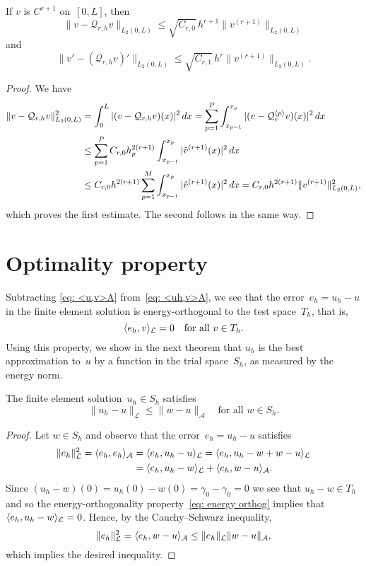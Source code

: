 \begin{theorem}\label{thm: Q r h}
If $v$ is $C^{r+1}$ on~$[0,L]$, then
\[
\|v-\mathcal{Q}_{r,h}v\|_{L_2(0,L)}
    \le\sqrt{C_{r,0}}\,h^{r+1}\|v^{(r+1)}\|_{L_2(0,L)}
\]
and
\[
\|v'-(\mathcal{Q}_{r,h}v)'\|_{L_2(0,L)}
    \le\sqrt{C_{r,1}}\,h^r\|v^{(r+1)}\|_{L_2(0,L)}.
\]
\end{theorem}
\begin{proof}
We have
\begin{align*}
\|v-\mathcal{Q}_{r,h}v\|_{L_2(0,L)}^2
    &=\int_0^L|(v-\mathcal{Q}_{r,h}v)(x)|^2\,dx=\sum_{p=1}^P
    \int_{x_{p-1}}^{x_p}|(v-\mathcal{Q}_r^{\langle p\rangle}v)(x)|^2\,dx\\
    &\le\sum_{p=1}^P C_{r,0}h_p^{2(r+1)}\int_{x_{p-1}}^{x_p}
        |\hat v^{(r+1)}(x)|^2\,dx\\
    &\le C_{r,0}h^{2(r+1)}\sum_{p=1}^M\int_{x_{p-1}}^{x_p} 
        |\hat v^{(r+1)}(x)|^2\,dx
    =C_{r,0}h^{2(r+1)}\|v^{(r+1)}\|_{L_2(0,L)}^2,
\end{align*}
which proves the first estimate.  The second follows in the same way.
\end{proof}

\section{Optimality property}
Subtracting \eqref{eq: <u,v>A} from~\eqref{eq: <uh,v>A}, we see that the
error~$e_h=u_h-u$ in the finite element solution is energy-orthogonal to the 
test space~$T_h$, that is, 
\begin{equation}\label{eq: energy orthog}
\langle e_h,v\rangle_{\mathcal{L}}=0\quad\text{for all $v\in T_h$.}
\end{equation}
Using this property, we show in the next theorem that $u_h$ is the best 
approximation to~$u$ by a function in the trial space~$S_h$, as measured by 
the energy norm.

\begin{theorem}\label{thm: optimality}
The finite element solution~$u_h\in S_h$ satisfies
\[
\|u_h-u\|_{\mathcal{L}}\le\|w-u\|_{\mathcal{A}}
	\quad\text{for all $w\in S_h$.}
\]
\end{theorem}
\begin{proof}
Let $w\in S_h$ and observe that the error~$e_h=u_h-u$ satisfies
\begin{align*}
\|e_h\|_{\mathcal{L}}^2=\langle e_h,e_h\rangle_{\mathcal{A}}
	&=\langle e_h,u_h-u\rangle_{\mathcal{L}}
	=\langle e_h,u_h-w+w-u\rangle_{\mathcal{L}}\\
	&=\langle e_h,u_h-w\rangle_{\mathcal{L}}+\langle e_h,w-u\rangle_{\mathcal{A}}.
\end{align*}
Since $(u_h-w)(0)=u_h(0)-w(0)=\gamma_0-\gamma_0=0$ we see that $u_h-w\in T_h$
and so the energy-orthogonality property~\eqref{eq: energy orthog} implies
that $\langle e_h,u_h-w\rangle_{\mathcal{L}}=0$.  Hence, by the Cauchy--Schwarz
inequality,
\[
\|e_h\|_{\mathcal{L}}^2=\langle e_h,w-u\rangle_{\mathcal{A}}
	\le\|e_h\|_{\mathcal{L}}\|w-u\|_{\mathcal{A}},
\]
which implies the desired inequality.
\end{proof}

